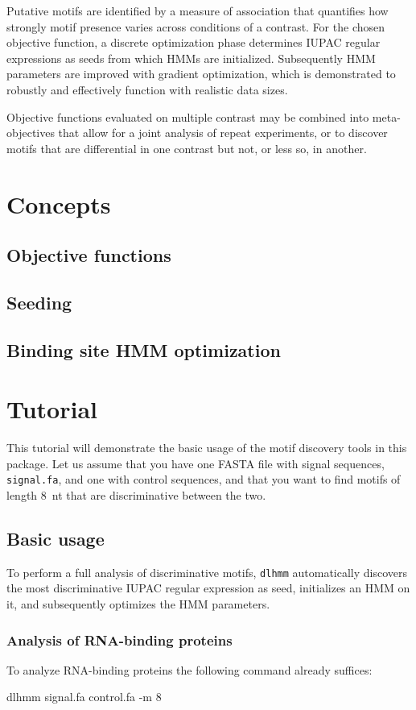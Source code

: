 \documentclass[a4paper]{article}
\newcommand{\dlhmm}[0]{\texttt{dlhmm}}
\begin{document}
Putative motifs are identified by a measure of association that quantifies how strongly motif presence varies across conditions of a contrast.
For the chosen objective function, a discrete optimization phase determines IUPAC regular expressions as seeds from which HMMs are initialized.
Subsequently HMM parameters are improved with gradient optimization, which is demonstrated to robustly and effectively function with realistic data sizes.

Objective functions evaluated on multiple contrast may be combined into meta-objectives that allow for a joint analysis of repeat experiments, or to discover motifs that are differential in one contrast but not, or less so, in another.

\section{Concepts}
\subsection{Objective functions}
\subsection{Seeding}
\subsection{Binding site HMM optimization}

\section{Tutorial}
This tutorial will demonstrate the basic usage of the motif discovery tools in this package.
Let us assume that you have one FASTA file with signal sequences, \verb|signal.fa|, and one with control sequences, and that you want to find motifs of length 8~nt that are discriminative between the two.
\subsection{Basic usage}
To perform a full analysis of discriminative motifs, \dlhmm{} automatically discovers the most discriminative IUPAC regular expression as seed, initializes an HMM on it, and subsequently optimizes the HMM parameters.
\subsubsection{Analysis of RNA-binding proteins}
To analyze RNA-binding proteins the following command already suffices:\\
\begin{verbbox}
dlhmm signal.fa control.fa -m 8
\end{verbbox}
\fbox{\theverbbox[t]}
\end{document}
